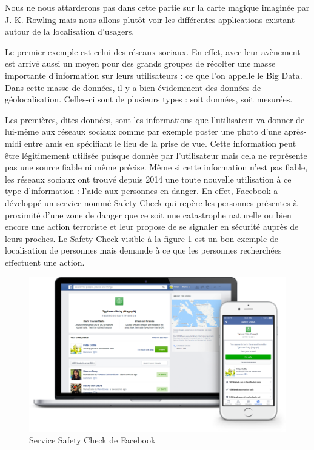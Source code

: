 Nous ne nous attarderons pas dans cette partie sur la carte magique imaginée par J. K. Rowling mais nous allons plutôt voir les différentes applications existant autour de la localisation d’usagers.

Le premier exemple est celui des réseaux sociaux. En effet, avec leur avènement est arrivé aussi un moyen pour des grands groupes de récolter une masse importante d’information sur leurs utilisateurs : ce que l’on appelle le Big Data. Dans cette masse de données, il y a bien évidemment des données de géolocalisation. Celles-ci sont de plusieurs types : soit données, soit mesurées.

Les premières, dites données, sont les informations que l’utilisateur va donner de lui-même aux réseaux sociaux comme par exemple poster une photo d’une après-midi entre amis en spécifiant le lieu de la prise de vue. Cette information peut être légitimement utilisée puisque donnée par l’utilisateur mais cela ne représente pas une source fiable ni même précise. Même si cette information n’est pas fiable, les réseaux sociaux ont trouvé depuis 2014 une toute nouvelle utilisation à ce type d’information : l’aide aux personnes en danger. En effet, Facebook a développé un service nommé Safety Check \cite{fbsafetycheck} qui repère les personnes présentes à proximité d’une zone de danger que ce soit une catastrophe naturelle ou bien encore une action terroriste et leur propose de se signaler en sécurité auprès de leurs proches. Le Safety Check visible à la figure \ref{safety-check} est un bon exemple de localisation de personnes mais demande à ce que les personnes recherchées effectuent une action.

\begin{figure}[H]
    \centering
    \includegraphics[width=\textwidth]{./img/safetycheck.png}
    \caption{Service Safety Check de Facebook}
    \label{safety-check}
\end{figure}


